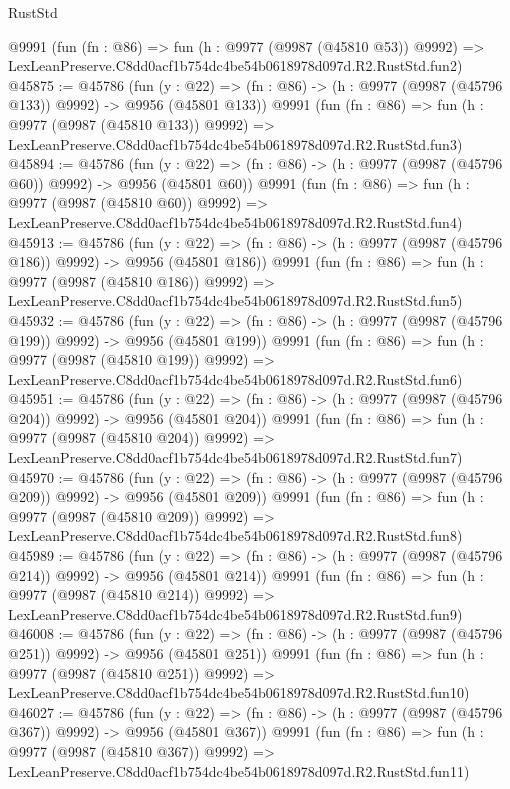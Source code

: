 \begin{lexlean}{RustStd}
\begin{coremodule}
    @9991
    (fun (fn : @86) =>
    fun (h : @9977 (@9987 (@45810 @53)) @9992) =>
    LexLeanPreserve.C8dd0acf1b754dc4be54b0618978d097d.R2.RustStd.fun2)
@45875 := @45786
    (fun (y : @22) => (fn : @86) -> (h : @9977 (@9987 (@45796 @133)) @9992) -> @9956 (@45801 @133))
    @9991
    (fun (fn : @86) =>
    fun (h : @9977 (@9987 (@45810 @133)) @9992) =>
    LexLeanPreserve.C8dd0acf1b754dc4be54b0618978d097d.R2.RustStd.fun3)
@45894 := @45786
    (fun (y : @22) => (fn : @86) -> (h : @9977 (@9987 (@45796 @60)) @9992) -> @9956 (@45801 @60))
    @9991
    (fun (fn : @86) =>
    fun (h : @9977 (@9987 (@45810 @60)) @9992) =>
    LexLeanPreserve.C8dd0acf1b754dc4be54b0618978d097d.R2.RustStd.fun4)
@45913 := @45786
    (fun (y : @22) => (fn : @86) -> (h : @9977 (@9987 (@45796 @186)) @9992) -> @9956 (@45801 @186))
    @9991
    (fun (fn : @86) =>
    fun (h : @9977 (@9987 (@45810 @186)) @9992) =>
    LexLeanPreserve.C8dd0acf1b754dc4be54b0618978d097d.R2.RustStd.fun5)
@45932 := @45786
    (fun (y : @22) => (fn : @86) -> (h : @9977 (@9987 (@45796 @199)) @9992) -> @9956 (@45801 @199))
    @9991
    (fun (fn : @86) =>
    fun (h : @9977 (@9987 (@45810 @199)) @9992) =>
    LexLeanPreserve.C8dd0acf1b754dc4be54b0618978d097d.R2.RustStd.fun6)
@45951 := @45786
    (fun (y : @22) => (fn : @86) -> (h : @9977 (@9987 (@45796 @204)) @9992) -> @9956 (@45801 @204))
    @9991
    (fun (fn : @86) =>
    fun (h : @9977 (@9987 (@45810 @204)) @9992) =>
    LexLeanPreserve.C8dd0acf1b754dc4be54b0618978d097d.R2.RustStd.fun7)
@45970 := @45786
    (fun (y : @22) => (fn : @86) -> (h : @9977 (@9987 (@45796 @209)) @9992) -> @9956 (@45801 @209))
    @9991
    (fun (fn : @86) =>
    fun (h : @9977 (@9987 (@45810 @209)) @9992) =>
    LexLeanPreserve.C8dd0acf1b754dc4be54b0618978d097d.R2.RustStd.fun8)
@45989 := @45786
    (fun (y : @22) => (fn : @86) -> (h : @9977 (@9987 (@45796 @214)) @9992) -> @9956 (@45801 @214))
    @9991
    (fun (fn : @86) =>
    fun (h : @9977 (@9987 (@45810 @214)) @9992) =>
    LexLeanPreserve.C8dd0acf1b754dc4be54b0618978d097d.R2.RustStd.fun9)
@46008 := @45786
    (fun (y : @22) => (fn : @86) -> (h : @9977 (@9987 (@45796 @251)) @9992) -> @9956 (@45801 @251))
    @9991
    (fun (fn : @86) =>
    fun (h : @9977 (@9987 (@45810 @251)) @9992) =>
    LexLeanPreserve.C8dd0acf1b754dc4be54b0618978d097d.R2.RustStd.fun10)
@46027 := @45786
    (fun (y : @22) => (fn : @86) -> (h : @9977 (@9987 (@45796 @367)) @9992) -> @9956 (@45801 @367))
    @9991
    (fun (fn : @86) =>
    fun (h : @9977 (@9987 (@45810 @367)) @9992) =>
    LexLeanPreserve.C8dd0acf1b754dc4be54b0618978d097d.R2.RustStd.fun11)

\end{coremodule}
\end{lexlean}
